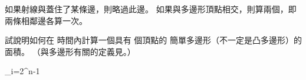 \startANSWER
如果射線與蓋住了某條邊，則略過此邊。
如果與多邊形頂點相交，則算兩個，即兩條相鄰邊各算一次。
\stopANSWER

\startEXERCISE
試說明如何在  時間內計算一個具有  個頂點的
簡單多邊形（不一定是凸多邊形）的面積。
（與多邊形有關的定義見。）
\stopEXERCISE

\startANSWER
\startformula
{}\sum_{i=2}^{n-1}  \times {}
\stopformula
\stopANSWER

\stopsection
